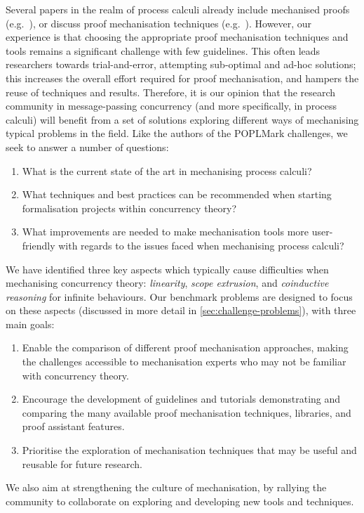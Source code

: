 \documentclass[runningheads]{llncs}
\begin{document}
Several papers in the realm of process calculi already include mechanised proofs
(e.g.~\cite{DBLP:conf/pldi/Castro-Perez0GY21,DBLP:conf/tacas/CastroFY20,lmcs:9985,
  DBLP:journals/jar/CruzFilipeMP23, Tirore:2023}), or
discuss proof mechanisation techniques
(e.g.~\cite{DBLP:journals/jar/BengtsonPW16, DBLP:conf/tphol/Gay01,
  DBLP:conf/ppdp/Thiemann19, DBLP:conf/forte/ZalakainD21}).  However, our
experience is that choosing the appropriate proof mechanisation techniques and
tools remains a significant challenge with few guidelines.  This often leads
researchers towards trial-and-error, attempting sub-optimal and ad-hoc
solutions; this increases the overall effort required for proof mechanisation,
and hampers the reuse of techniques and results.
%
Therefore, it is our opinion that the research community in message-passing
concurrency (and more specifically, in process calculi) will benefit from a set
of solutions exploring different ways of mechanising typical problems in the
field.
Like the authors of the POPLMark challenges, we seek to
answer a number of questions:
\begin{enumerate}[label=\textbf{(Q\arabic*)},leftmargin=10mm]
\item\label{item:rq1} What is the current state of the art in mechanising process calculi?
\item\label{item:rq2} What techniques and best practices can be recommended when starting formalisation projects within concurrency theory?
\item\label{item:rq3} What improvements are needed to make mechanisation tools more user-friendly with regards to the issues faced when mechanising process calculi?
\end{enumerate}
We have identified three key aspects which typically cause difficulties when
mechanising concurrency theory: \emph{linearity}, \emph{scope extrusion},
and \emph{coinductive reasoning} for infinite behaviours.
Our benchmark problems are designed to focus on these aspects (discussed
in more detail in \cref{sec:challenge-problems}), with three main goals:

\begin{enumerate}[label=\textbf{(G\arabic*)},leftmargin=10mm]
\item\label{item:goal-comperison-accessibility} Enable the comparison of
  different proof mechanisation approaches, making the challenges accessible to
  mechanisation experts who may not be familiar with concurrency theory.

\item\label{item:goal-tutorials} Encourage the development of guidelines and
  tutorials demonstrating and comparing the many available proof mechanisation
  techniques, libraries, and proof assistant features.

\item\label{item:goal-reusability} Prioritise the exploration of mechanisation
  techniques that may be useful and reusable for future research.
\end{enumerate}
We also aim at strengthening the culture of mechanisation, by rallying the
community to collaborate on exploring and developing new tools and techniques.
\end{document}
